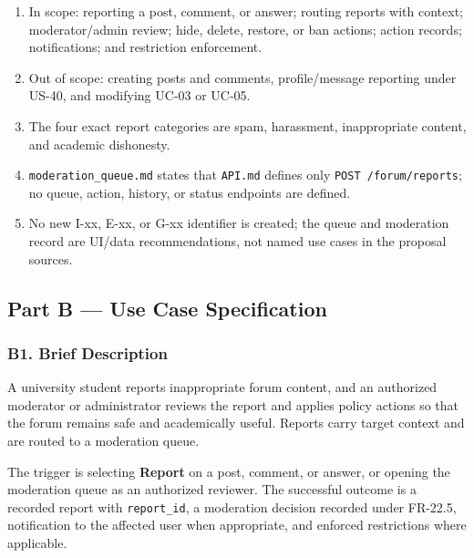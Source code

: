 \documentclass[12pt]{article}
\begin{document}
\begin{enumerate}
\item In scope: reporting a post, comment, or answer; routing reports with context; moderator/admin review; hide, delete, restore, or ban actions; action records; notifications; and restriction enforcement.
\item Out of scope: creating posts and comments, profile/message reporting under US-40, and modifying UC-03 or UC-05.
\item The four exact report categories are spam, harassment, inappropriate content, and academic dishonesty.
\item \texttt{moderation\_queue.md} states that \texttt{API.md} defines only \texttt{POST /forum/reports}; no queue, action, history, or status endpoints are defined.
\item No new I-xx, E-xx, or G-xx identifier is created; the queue and moderation record are UI/data recommendations, not named use cases in the proposal sources.
\end{enumerate}
\par\medskip

\hypertarget{sec:part-b-use-case-specification}{}
\subsection*{Part B --- Use Case Specification}
\par\medskip

\hypertarget{sec:b1-brief-description}{}
\subsubsection*{B1. Brief Description}
\par\medskip

A university student reports inappropriate forum content, and an authorized moderator or administrator reviews the report and applies policy actions so that the forum remains safe and academically useful. Reports carry target context and are routed to a moderation queue.
\par\medskip

The trigger is selecting \textbf{Report} on a post, comment, or answer, or opening the moderation queue as an authorized reviewer. The successful outcome is a recorded report with \texttt{report\_id}, a moderation decision recorded under FR-22.5, notification to the affected user when appropriate, and enforced restrictions where applicable.
\par\medskip
\end{document}
